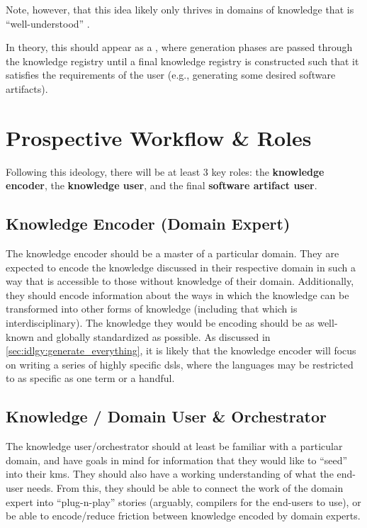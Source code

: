 Note, however, that this idea likely only thrives in domains of knowledge that
is ``well-understood'' \cite{well-understood}.

In theory, this should appear as a , where generation phases are passed
through the knowledge registry until a final knowledge registry is constructed
such that it satisfies the requirements of the user (e.g., generating some
desired software artifacts).

\section{Prospective Workflow \& Roles}
\label{sec:idlgy:prospective_workflow}


Following this ideology, there will be at least 3 key roles: the
\textbf{knowledge encoder}, the \textbf{knowledge user}, and the final
\textbf{software artifact user}.

\subsection{Knowledge Encoder (Domain Expert)}

The knowledge encoder should be a master of a particular domain. They are
expected to encode the knowledge discussed in their respective domain in such a
way that is accessible to those without knowledge of their domain. Additionally,
they should encode information about the ways in which the knowledge can be
transformed into other forms of knowledge (including that which is
interdisciplinary). The knowledge they would be encoding should be as well-known
and globally standardized as possible. As discussed in
\autoref{sec:idlgy:generate_everything}, it is likely that the knowledge encoder
will focus on writing a series of highly specific \aclp{dsl}, where the
languages may be restricted to as specific as one term or a handful.

\subsection{Knowledge / Domain User \& Orchestrator}

The knowledge user/orchestrator should at least be familiar with a particular
domain, and have goals in mind for information that they would like to ``seed''
into their \acl{kms}. They should also have a working understanding of what the
end-user needs. From this, they should be able to connect the work of the domain
expert into ``plug-n-play'' stories (arguably, compilers for the end-users to
use), or be able to encode/reduce friction between knowledge encoded by domain
experts.

